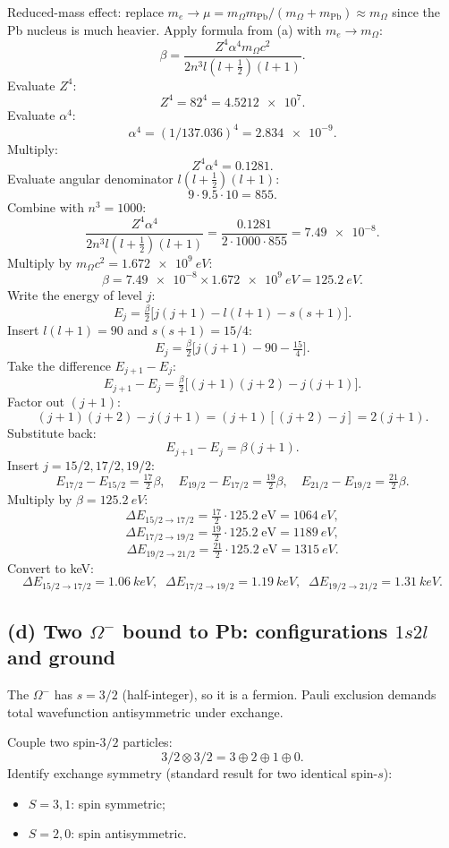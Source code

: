 \documentclass[11pt]{article}
\begin{document}
Reduced-mass effect: replace $m_e\to\mu = m_\Omega m_\text{Pb}/(m_\Omega+m_\text{Pb})\approx m_\Omega$ since the Pb nucleus is much heavier. Apply formula from (a) with $m_e\to m_\Omega$:
\[
\beta = \frac{Z^4\alpha^4 m_\Omega c^2}{2 n^3 l(l+\tfrac12)(l+1)}.
\]
Evaluate $Z^4$:
\[
Z^4 = 82^4 = \num{4.5212e7}.
\]
Evaluate $\alpha^4$:
\[
\alpha^4 = (1/137.036)^4 = \num{2.834e-9}.
\]
Multiply:
\[
Z^4\alpha^4 = 0.1281.
\]
Evaluate angular denominator $l(l+\tfrac12)(l+1)$:
\[
9\cdot 9.5\cdot 10 = 855.
\]
Combine with $n^3 = 1000$:
\[
\frac{Z^4\alpha^4}{2 n^3 l(l+\tfrac12)(l+1)} = \frac{0.1281}{2\cdot 1000\cdot 855} = \num{7.49e-8}.
\]
Multiply by $m_\Omega c^2 = \SI{1.672e9}{eV}$:
\[
\beta = \num{7.49e-8}\times\SI{1.672e9}{eV} = \SI{125.2}{eV}.
\]
Write the energy of level $j$:
\[
E_j = \tfrac{\beta}{2}\bigl[j(j+1)-l(l+1)-s(s+1)\bigr].
\]
Insert $l(l+1)=90$ and $s(s+1)=15/4$:
\[
E_j = \tfrac{\beta}{2}\bigl[j(j+1)-90-\tfrac{15}{4}\bigr].
\]
Take the difference $E_{j+1}-E_j$:
\[
E_{j+1}-E_j = \tfrac{\beta}{2}\bigl[(j+1)(j+2)-j(j+1)\bigr].
\]
Factor out $(j+1)$:
\[
(j+1)(j+2)-j(j+1) = (j+1)[(j+2)-j] = 2(j+1).
\]
Substitute back:
\[
E_{j+1}-E_j = \beta(j+1).
\]
Insert $j=15/2,17/2,19/2$:
\[
E_{17/2}-E_{15/2}=\tfrac{17}{2}\beta,\quad
E_{19/2}-E_{17/2}=\tfrac{19}{2}\beta,\quad
E_{21/2}-E_{19/2}=\tfrac{21}{2}\beta.
\]
Multiply by $\beta=\SI{125.2}{eV}$:
\[
\Delta E_{15/2\to 17/2} = \tfrac{17}{2}\cdot 125.2\;\text{eV} = \SI{1064}{eV},
\]
\[
\Delta E_{17/2\to 19/2} = \tfrac{19}{2}\cdot 125.2\;\text{eV} = \SI{1189}{eV},
\]
\[
\Delta E_{19/2\to 21/2} = \tfrac{21}{2}\cdot 125.2\;\text{eV} = \SI{1315}{eV}.
\]
Convert to keV:
\[
\boxed{\;\Delta E_{15/2\to 17/2} = \SI{1.06}{keV},\;\;
\Delta E_{17/2\to 19/2} = \SI{1.19}{keV},\;\;
\Delta E_{19/2\to 21/2} = \SI{1.31}{keV}.\;}
\]

\subsection*{(d) Two $\Omega^-$ bound to Pb: configurations $1s2l$ and ground}

The $\Omega^-$ has $s=3/2$ (half-integer), so it is a fermion. Pauli exclusion demands total wavefunction antisymmetric under exchange.

Couple two spin-$3/2$ particles:
\[
3/2\otimes 3/2 = 3\oplus 2\oplus 1\oplus 0.
\]
Identify exchange symmetry (standard result for two identical spin-$s$):
\begin{itemize}
\item $S=3,1$: spin symmetric;
\item $S=2,0$: spin antisymmetric.
\end{itemize}
\end{document}
